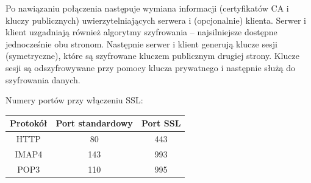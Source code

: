 \documentclass[../main.tex]{subfiles}
\begin{document}
Po nawiązaniu połączenia następuje wymiana informacji (certyfikatów CA i kluczy publicznych)
uwierzytelniających serwera i (opcjonalnie) klienta.
Serwer i klient uzgadniają również algorytmy szyfrowania –
najsilniejsze dostępne jednocześnie obu stronom.
Następnie serwer i klient generują klucze sesji (symetryczne), które są szyfrowane kluczem
publicznym drugiej strony. Klucze sesji są odszyfrowywane przy pomocy klucza prywatnego i
następnie służą do szyfrowania danych.


Numery portów przy włączeniu SSL:

\begin{tabular}{|c|c|c|}
    \hline
    Protokół & Port standardowy & Port SSL\\
    \hline
    HTTP & 80 & 443\\
    \hline
    IMAP4 & 143 & 993\\
    \hline
    POP3 & 110 & 995\\
    \hline
\end{tabular}
\end{document}
